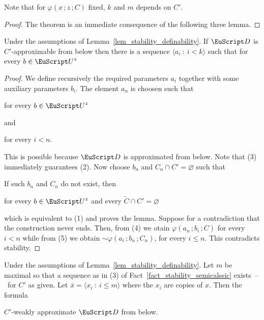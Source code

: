 Note that for $\varphi(x\,;z\,;C)$ fixed, $k$ and $m$ depends on $C'$. 

\begin{proof}
  The theorem is an immediate consequence of the following three lemma.
\end{proof}

\begin{lemma}
  Under the assumptions of Lemma~\ref{lem_stability_definability}.
  If ${\EuScript D}$ is $C'$-approximable from below then there is a sequence $\langle a_i\ :\ i<k\rangle$ such that for every $b\in{\EuScript U}^z$\medskip

  \medskip 

\end{lemma}

\begin{proof}
We define recursively the required parameters $a_i$ together with some auxiliary parameters $b_i$.
The element $a_n$ is choosen such that

\hfill for every $b\in{\EuScript U}^z$

and

\hfill for every $i<n$.\smallskip

This is possible because ${\EuScript D}$ is approximated from below.
Note that (3) immediately guarantees (2).
Now choose $b_n$ and $C_n\cap C'=\varnothing$ such that


If such $b_n$ and $C_n$ do not exist, then 

\hfill for every $b\in{\EuScript U}^z$ and every $\tilde C\cap C'=\varnothing$%

which is equivalent to (1) and proves the lemma.
Suppose for a contradiction that the construction never ends.
Then, from (4) we otain $\varphi(a_n\,;b_i\,;C)$ for every $i<n$ while from (5) we obtain ${\sim}\varphi(a_i\,;b_n\,;C_n)$, for every $i\le n$.
This contradicts stability.
\end{proof}

\begin{lemma}
  Under the assumptions of Lemma~\ref{lem_stability_definability}.
  Let $m$ be maximal so that a sequence as in (3) of Fact~\ref{fact_stability_semicalssic} exists~--~for $C'$ as given.
  Let $\bar x=\langle x_i\ :\ i\le m\rangle$ where the $x_i$ are copies of $x$.
  Then the formula\medskip


  $C'$-weakly approximate ${\EuScript D}$ from below.
\end{lemma}

